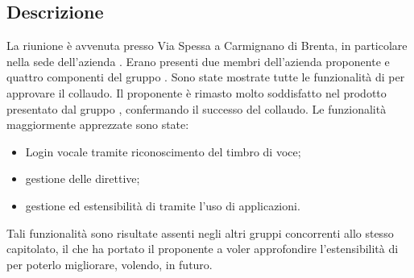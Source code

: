 \documentclass[a4paper,titlepage]{article}
\begin{document}
		\subsection{Descrizione}
		La riunione è avvenuta presso Via Spessa a Carmignano di Brenta, in particolare nella sede dell'azienda \PROPONENTE. Erano presenti due membri dell'azienda proponente e quattro componenti del gruppo \GRUPPO{}. Sono state mostrate tutte le funzionalità di \PROGETTO{} per approvare il collaudo.
Il proponente \PROPONENTE{} è rimasto molto soddisfatto nel prodotto presentato dal gruppo \GRUPPO{}, confermando il successo del collaudo.
Le funzionalità maggiormente apprezzate sono state:
\begin{itemize}
	\item Login vocale tramite riconoscimento del timbro di voce;
	\item gestione delle direttive;
	\item gestione ed estensibilità di \PROGETTO{} tramite l'uso di applicazioni.
\end{itemize}
Tali funzionalità sono risultate assenti negli altri gruppi concorrenti allo stesso capitolato, il che ha portato il proponente \PROPONENTE{} a voler approfondire l'estensibilità di \PROGETTO{} per poterlo migliorare, volendo, in futuro.

		
	
\end{document}
